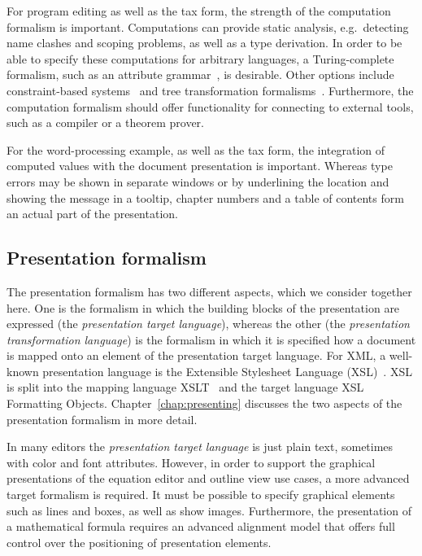
For program editing as well as the tax form, the strength of the computation formalism is important. Computations can provide static analysis, e.g.\ detecting name clashes and scoping problems, as well as a type derivation. In order to be able to specify these computations for arbitrary languages, a Turing-complete formalism, such as an attribute grammar~\cite{swierstra04ag}, is desirable. Other options include constraint-based systems~\cite{ganzevoort92views, christopher90constraints, ballance92pan} and tree transformation formalisms~\cite{visser01stratego, xslt10}. Furthermore, the computation formalism should offer functionality for connecting to external tools, such as a compiler or a theorem prover.

For the word-processing example, as well as the tax form, the integration of computed values with the document presentation is important. Whereas type errors may be shown in separate windows or by underlining the location and showing the message in a tooltip, chapter numbers and a table of contents form an actual part of the presentation. 



%																
\subsection{Presentation formalism}

The presentation formalism has two different aspects, which we consider together here. One is the formalism in which the building blocks of the presentation are expressed (the {\em presentation target language}), whereas the other  (the {\em presentation transformation language}) is the formalism in which it is specified how a document is mapped onto an element of the presentation target language. For XML, a well-known presentation language is the Extensible Stylesheet Language (XSL)~\cite{xsl10}. XSL is split into the mapping language XSLT~\cite{xslt10} and the target language XSL Formatting Objects. Chapter~\ref{chap:presenting} discusses the two aspects of the presentation formalism in more detail.

In many editors the {\em presentation target language} is just plain text, sometimes with color and font attributes. However, in order to support the graphical presentations of the equation editor and outline view use cases, a more advanced target formalism is required. It must be possible to specify graphical elements such as lines and boxes, as well as show images. Furthermore, the presentation of a mathematical formula requires an advanced alignment model that offers full control over the positioning of presentation elements.

